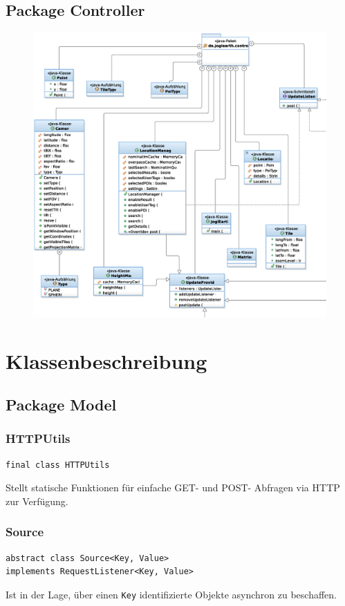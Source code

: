 \documentclass[10pt]{scrreprt}
\begin{document}
\section{Package Controller}
\begin{figure}[!htb]
	\includegraphics[scale=0.5]{JoglDiagramm_Controller.eps}
\vspace{2.0 cm}
\end{figure}

\chapter{Klassenbeschreibung}

\section{Package Model}


\subsection*{HTTPUtils}
\begin{lstlisting}
final class HTTPUtils
\end{lstlisting}
Stellt statische Funktionen für einfache GET- und POST- Abfragen via HTTP zur Verfügung.\\

\subsection*{Source}
\begin{lstlisting}
abstract class Source<Key, Value>
implements RequestListener<Key, Value>
\end{lstlisting}
Ist in der Lage, über einen \texttt{Key} identifizierte Objekte asynchron zu beschaffen.
\\
\end{document}
